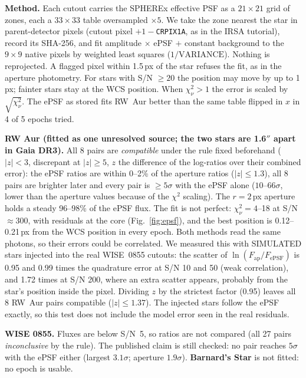 \documentclass[11pt,a4paper]{article}
\begin{document}
\textbf{Method.} Each cutout carries the SPHEREx effective PSF as a $21\times21$ grid of zones, each a $33\times33$ table
oversampled $\times5$. We take the zone nearest the star in parent-detector pixels (cutout pixel $+1-$\texttt{CRPIX1A},
as in the IRSA tutorial), record its SHA-256, and fit amplitude $\times$ ePSF $+$ constant background to the $9\times9$
native pixels by weighted least squares ($1/\mathrm{VARIANCE}$). Nothing is reprojected. A flagged pixel within 1.5\,px
of the star refuses the fit, as in the aperture photometry. For stars with S/N $\ge20$ the position may move by up to
1\,px; fainter stars stay at the WCS position. When $\chi^2_\nu>1$ the error is scaled by $\sqrt{\chi^2_\nu}$.
The ePSF as stored fits RW~Aur better than the same table flipped in $x$ in 4 of 5 epochs tried.

\textbf{RW Aur (fitted as one unresolved source; the two stars are 1.6$''$ apart in Gaia DR3).} All 8 pairs are
\emph{compatible} under the rule fixed beforehand ($|z|<3$, discrepant at $|z|\ge5$, $z$ the difference of the
log-ratios over their combined error): the ePSF ratios are within 0--2\% of the aperture ratios ($|z|\le1.3$),
all 8 pairs are brighter later and every pair is $\ge5\sigma$ with the ePSF alone ($10$--$66\sigma$, lower than the
aperture values because of the $\chi^2$ scaling). The $r=2$\,px aperture holds a steady 96--98\% of the ePSF flux.
The fit is not perfect: $\chi^2_\nu=4$--18 at S/N $\approx300$, with residuals at the core
(Fig.~\ref{fig:epsf}), and the best position is 0.12--0.21\,px from the WCS position in every epoch.
Both methods read the same photons, so their errors could be correlated. We measured this with SIMULATED stars
injected into the real WISE~0855 cutouts: the scatter of $\ln(F_\mathrm{ap}/F_\mathrm{ePSF})$ is 0.95 and 0.99 times
the quadrature error at S/N 10 and 50 (weak correlation), and 1.72 times at S/N 200, where an extra scatter appears,
probably from the star's position inside the pixel. Dividing $z$ by the strictest factor (0.95) leaves all 8 RW~Aur
pairs compatible ($|z|\le1.37$). The injected stars follow the ePSF exactly, so this test does not include the
model error seen in the real residuals.

\textbf{WISE 0855.} Fluxes are below S/N~5, so ratios are not compared (all 27 pairs \emph{inconclusive} by the rule).
The published claim is still checked: no pair reaches $5\sigma$ with the ePSF either (largest $3.1\sigma$; aperture
$1.9\sigma$). \textbf{Barnard's Star} is not fitted: no epoch is usable.
\end{document}
